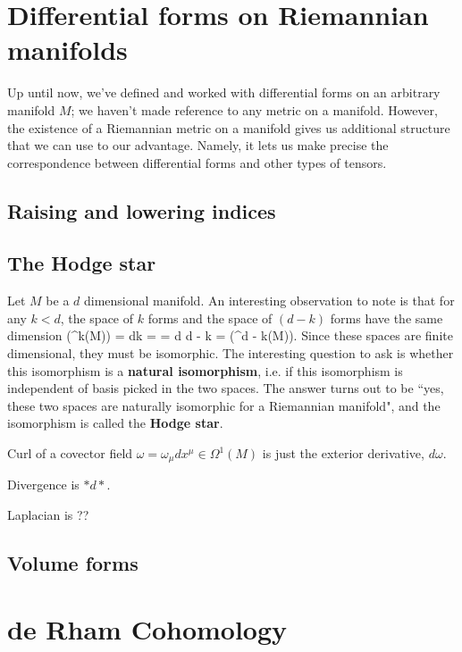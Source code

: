 \newpage
\section{Differential forms on Riemannian manifolds}

Up until now, we've defined and worked with differential forms on an arbitrary manifold $M$; we haven't made reference to any metric on a manifold. However, the existence of a Riemannian metric on a manifold gives us additional structure that we can use to our advantage. Namely, it lets us make precise the correspondence between differential forms and other types of tensors. 

\subsection{Raising and lowering indices}

\subsection{The Hodge star}

Let $M$ be a $d$ dimensional manifold. An interesting observation to note is that for any $k < d$, the space of $k$ forms and the space of $(d-k)$ forms have the same dimension
\eq
	\dim (\Omega^k(M)) = {d\choose k} = = {d \choose d - k} = \dim (\Omega^{d - k}(M)). 
\qe
Since these spaces are finite dimensional, they must be isomorphic. The interesting question to ask is whether this isomorphism is a \textbf{natural isomorphism}, i.e. if this isomorphism is independent of basis picked in the two spaces. The answer turns out to be ``yes, these two spaces are naturally isomorphic for a Riemannian manifold", and the isomorphism is called the \textbf{Hodge star}. 

\begin{example}
	Curl of a covector field $\omega = \omega_\mu dx^\mu\in\Omega^1(M)$ is just the exterior derivative, $d\omega$. 
	
	Divergence is $*d*$. 
	
	Laplacian is ??
\end{example}

\subsection{Volume forms}

\newpage
\section{de Rham Cohomology}

